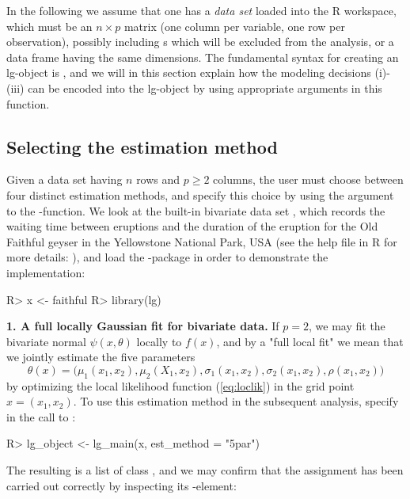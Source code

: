In the following we assume that one has a \emph{data set}  loaded into the R workspace, which must be an $n\times p$ matrix (one column per variable, one row per observation), possibly including s which will be excluded from the analysis, or a data frame having the same dimensions. The fundamental syntax for creating an lg-object is , and we will in this section explain how the modeling decisions (i)-(iii) can be encoded into the lg-object by using appropriate arguments in this function.

\subsection{Selecting the estimation method}
\label{chap:est-method}

Given a data set  having $n$ rows and $p \geq 2$ columns, the user must choose between four distinct estimation methods, and specify this choice by using the argument  to the -function. We look at the built-in bivariate data set , which records the waiting time between eruptions and the duration of the eruption for the Old Faithful geyser in the Yellowstone National Park, USA (see the help file in R for more details: ), and load the -package in order to demonstrate the implementation:

\begin{example}
R> x <- faithful
R> library(lg)
\end{example}

\textbf{1. A full locally Gaussian fit for bivariate data.} If $p = 2$, we may fit the bivariate normal $\psi(x, \theta)$ locally to $f(x)$, and by a "full local fit" we mean that we jointly estimate the five parameters
$$\theta(x) = \big(\mu_1(x_1, x_2), \mu_2(X_1, x_2), \sigma_1(x_1, x_2), \sigma_2(x_1,x_2),\rho(x_1, x_2)\big)$$
by optimizing the local likelihood function (\ref{eq:loclik}) in the grid point $x = (x_1, x_2)$. To use this estimation method in the subsequent analysis, specify  in the call to :

\begin{example}
R> lg_object <- lg_main(x, est_method = "5par")
\end{example}
The resulting  is a list of class , and we may confirm that the assignment has been carried out correctly by inspecting its -element:

